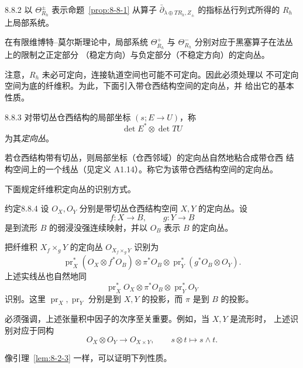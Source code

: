 \begin{definition}{8.8.2}\label{def:8-8-2}
以 $\Theta^\pm_{R_h}$ 表示命题~\ref{prop:8-8-1} 从算子
$\bar\partial_{\lambda\oplus TR_h,Z_\pm}$ 的指标丛行列式所得的
$R_h$ 上局部系统。
\end{definition}

在有限维博特--莫尔斯理论中，局部系统 $\Theta^+_{R_h}$ 与
$\Theta^-_{R_h}$ 分别对应于黑塞算子在法丛上的限制之正定部分
（稳定方向）与负定部分（不稳定方向）的定向丛。

注意，$R_h$ 未必可定向，连接轨道空间也可能不可定向。因此必须处理以
不可定向空间为底的纤维积。为此，下面引入带仓西结构空间的定向丛，并
给出它的基本性质。

\begin{definition}{8.8.3}\label{def:8-8-3}
对带切丛仓西结构的局部坐标
$(s;E\to U)$，称
\[
 \det E^*\otimes\det TU
\]
为其\emph{定向丛}。
\end{definition}

若仓西结构带有切丛，则局部坐标（仓西邻域）的定向丛自然地粘合成带仓西
结构空间上的一个线丛（见定义 A1.14）。称它为该带仓西结构空间的定向丛。

下面规定纤维积定向丛的识别方式。

\begin{statement}{约定}{8.8.4}\label{conv:8-8-4}
设 $O_X,O_Y$ 分别是带切丛仓西结构空间 $X,Y$ 的定向丛。设
\[
 f\colon X\to B,\qquad g\colon Y\to B
\]
是到流形 $B$ 的弱浸没强连续映射，并以 $O_B$ 表示 $B$ 的定向丛。

把纤维积 $X_f\times_gY$ 的定向丛
$O_{X_f\times_gY}$ 识别为
\[
 \operatorname{pr}_X^*(O_X\otimes f^*O_B)
 \otimes\pi^*O_B
 \otimes
 \operatorname{pr}_Y^*(g^*O_B\otimes O_Y).
\]
上述实线丛也自然地同
\[
 \operatorname{pr}_X^*O_X
 \otimes\pi^*O_B
 \otimes\operatorname{pr}_Y^*O_Y
\]
识别。这里 $\operatorname{pr}_X,\operatorname{pr}_Y$ 分别是到
$X,Y$ 的投影，而 $\pi$ 是到 $B$ 的投影。

必须强调，上述张量积中因子的次序至关重要。例如，当 $X,Y$ 是流形时，
上述识别对应于同构
\[
 O_X\otimes O_Y\longrightarrow O_{X\times Y},
 \qquad s\otimes t\longmapsto s\wedge t.
\]
\end{statement}

像引理~\ref{lem:8-2-3} 一样，可以证明下列性质。


